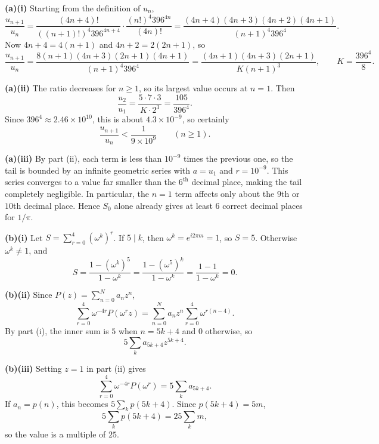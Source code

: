 \begin{solution}
\small
\textbf{(a)(i)} Starting from the definition of $u_n$,
\[
\frac{u_{n+1}}{u_n}
= \frac{(4n+4)!}{((n+1)!)^4 396^{4n+4}} \cdot \frac{(n!)^4 396^{4n}}{(4n)!}
= \frac{(4n+4)(4n+3)(4n+2)(4n+1)}{(n+1)^4 396^4}.
\]
Now $4n+4=4(n+1)$ and $4n+2=2(2n+1)$, so
\[
\frac{u_{n+1}}{u_n}
= \frac{8(n+1)(4n+3)(2n+1)(4n+1)}{(n+1)^4 396^4}
= \frac{(4n+1)(4n+3)(2n+1)}{K(n+1)^3},
\qquad K=\frac{396^4}{8}.
\]

\textbf{(a)(ii)} The ratio decreases for $n\ge1$, so its largest value occurs at $n=1$. Then
\[
\frac{u_2}{u_1}
= \frac{5\cdot7\cdot3}{K\cdot2^3}
= \frac{105}{396^4}.
\]
Since $396^4\approx 2.46\times 10^{10}$, this is about $4.3\times10^{-9}$, so certainly
\[
\frac{u_{n+1}}{u_n}<\frac{1}{9\times10^9}
\qquad (n\ge1).
\]

\textbf{(a)(iii)} By part (ii), each term is less than $10^{-9}$ times the previous one, so the tail is bounded by an infinite geometric series with $a = u_1$ and $r = 10^{-9}$. This series converges to a value far smaller than the $6^{\text{th}}$ decimal place, making the tail completely negligible. In particular, the $n=1$ term affects only about the $9$th or $10$th decimal place. Hence $S_0$ alone already gives at least $6$ correct decimal places for $1/\pi$.

\textbf{(b)(i)} Let $S=\sum_{r=0}^4 (\omega^k)^r$. If $5\mid k$, then $\omega^k=e^{i2\pi m}=1$, so $S=5$. Otherwise $\omega^k\ne1$, and
\[
S=\frac{1-(\omega^k)^5}{1-\omega^k}
=\frac{1-(\omega^5)^k}{1-\omega^k}
=\frac{1-1}{1-\omega^k}=0.
\]

\textbf{(b)(ii)} Since $P(z)=\sum_{n=0}^N a_n z^n$,
\[
\sum_{r=0}^4 \omega^{-4r}P(\omega^r z)
= \sum_{n=0}^N a_n z^n \sum_{r=0}^4 \omega^{r(n-4)}.
\]
By part (i), the inner sum is $5$ when $n=5k+4$ and $0$ otherwise, so
\[
5\sum_k a_{5k+4}z^{5k+4}.
\]

\textbf{(b)(iii)} Setting $z=1$ in part (ii) gives
\[
\sum_{r=0}^4 \omega^{-4r}P(\omega^r)=5\sum_k a_{5k+4}.
\]
If $a_n=p(n)$, this becomes $5\sum_k p(5k+4)$. Since $p(5k+4)=5m$,
\[
5\sum_k p(5k+4)=25\sum_k m,
\]
so the value is a multiple of $25$.
\normalsize
\end{solution}

